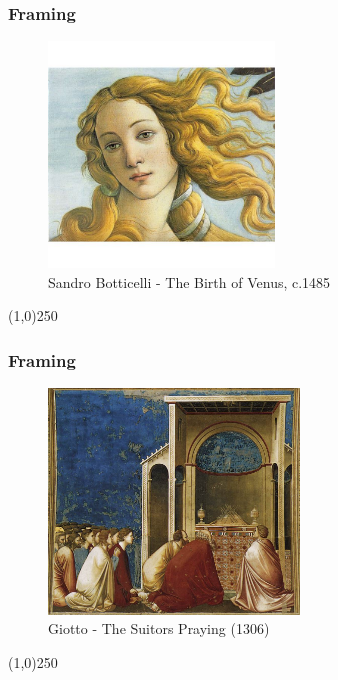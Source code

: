 \begin{frame}
\frametitle{Framing}
\begin{figure}
	\centering
	\includegraphics[height=6cm]{img/CandC/BirthofVenusCrop.jpg}
	\caption[Sandro Botticelli - The Birth of Venus, c.1485]{Sandro Botticelli - The Birth of Venus, c.1485}
	\label{fig:sandrobotticelliVenus}
\end{figure}
\end{frame}
\begin{center}\line(1,0){250}\end{center}



\begin{frame}
\frametitle{Framing}
\begin{figure}
	\centering
	\includegraphics[height=6cm]{img/CandC/the-suitors-praying}
	\caption{Giotto - The Suitors Praying (1306)}
	\label{fig:the-suitors-praying}
\end{figure}
\end{frame}
\begin{center}\line(1,0){250}\end{center}



